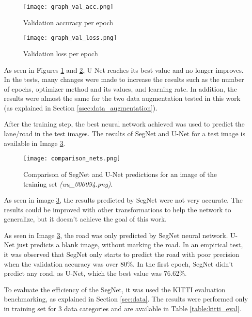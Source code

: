 \documentclass[10pt,twocolumn,letterpaper]{article}
\begin{document}
\begin{figure}[ht]
  \centering
  \texttt{[image: graph\_val\_acc.png]}
  \caption{Validation accuracy per epoch}
  \label{fig:val_acc}
\end{figure}

\begin{figure}[ht]
  \centering
  \texttt{[image: graph\_val\_loss.png]}
  \caption{Validation loss per epoch}
  \label{fig:val_loss}
\end{figure}

As seen in Figures \ref{fig:val_acc} and \ref{fig:val_loss}, U-Net reaches its best value and no longer improves. In the tests, many changes were made to increase the results such as the number of epochs, optimizer method and its values, and learning rate. In addition, the results were almost the same for the two data augmentation tested in this work (as explained in Section \ref{ssec:data_augmentation}).

After the training step, the best neural network achieved was used to predict the lane/road in the test images. The results of SegNet and U-Net for a test image is available in Image 
\ref{fig:neural_net_predict}.

\begin{figure}[ht]
  \centering
  \texttt{[image: comparison\_nets.png]}
  \caption{Comparison of SegNet and U-Net predictions for an image of the training set \textit{(uu\_000094.png)}.}
  \label{fig:neural_net_predict}
\end{figure} 

As seen in image \ref{fig:neural_net_predict}, the results predicted by SegNet were not very accurate. The results could be improved with other transformations to help the network to generalize, but it doesn't achieve the goal of this work.

As seen in Image \ref{fig:neural_net_predict}, the road was only predicted by SegNet neural network. U-Net just predicts a blank image, without marking the road. In an empirical test, it was observed that SegNet only starts to predict the road with poor precision when the validation accuracy was over 80\%. In the first epoch, SegNet didn't predict any road, as U-Net, which the best value was 76.62\%.

To evaluate the efficiency of the SegNet, it was used the KITTI evaluation benchmarking, as explained in Section \ref{sec:data}. The results were performed only in training set for 3 data categories and are available in Table \ref{table:kitti_eval}.
\end{document}
